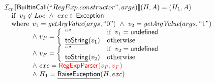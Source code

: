 \[\begin{array}{l}
\I_{cp}\lbr \SF{BuiltinCall}(``RegExp.constructor", args)\rbr(H,A)
= (H_1, A)\\
\quad\ifc{
   v_{1} \not\in Loc ~\land~ exc \in \SF{Exception}\\
 }\\
\quad\wherec{
  v_{1} = \hf{getArgValue}(args, ``0") ~\land~  v_{2} = \hf{getArgValue}(args, ``1")\\
  \land~ v_P = \left\{
    \begin{array}{ll}
      ``" & \ifc{v_{1} = \SF{undefined}} \\
      \chf{toString}(v_{1}) & \owc %
    \end{array}
  \right.\\
  \land~ v_F = \left\{
    \begin{array}{ll}
      ``" & \ifc{v_{2} = \SF{undefined}} \\
      \chf{toString}(v_{2}) & \owc
    \end{array}
  \right.\\
  \land~ exc = {\inred \chf{RegExpParser}(v_{P}, v_{F})} \\
  \land~ H_1 = \chf{RaiseException}(H, exc) \\
}\\

\end{array}
\]

